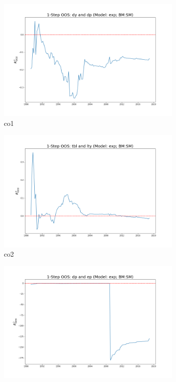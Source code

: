 \documentclass[a4paper,12pt,times,numbered,print,index]{report}
\numberwithin{equation}{section}
\begin{document}
\begin{figure}[!htbp]
	\centering
	\caption{OOS Results for Model with $f_6$}
	\begin{subfigure}[b]{0.42\linewidth}
		\includegraphics[width=0.9\linewidth]{OOS_plots/exp_co1_SM.png}
		\caption{co1}
	\end{subfigure}
	\begin{subfigure}[b]{0.42\linewidth}
		\includegraphics[width=0.9\linewidth]{OOS_plots/exp_co2_SM.png}
		\caption{co2}
	\end{subfigure}
	\begin{subfigure}[b]{0.42\linewidth}
		\includegraphics[width=0.9\linewidth]{OOS_plots/exp_co3_SM.png}

\end{subfigure}
\end{figure}
\end{document}
